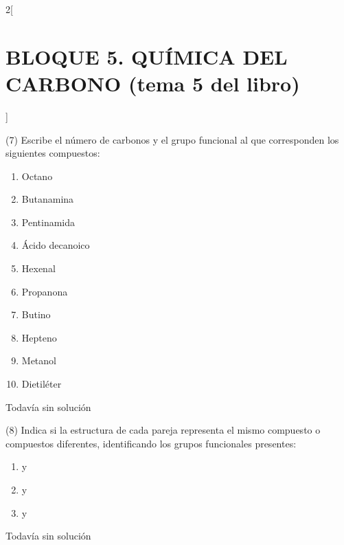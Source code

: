 \documentclass[10pt]{article}
\begin{document}
\begin{multicols}{2}[
  \section{BLOQUE 5. QUÍMICA DEL CARBONO (tema 5 del libro)}
  ]
\begin{exercise}[
    tags    = {},
    topics  = {química,química básica},
    source  = {FQ 1B MGH 2016, p85, e26},
  ]

  (7) Escribe el número de carbonos y el grupo funcional al que
  corresponden los siguientes compuestos:
  \begin{enumerate}
    \item Octano
    \item Butanamina
    \item Pentinamida
    \item Ácido decanoico
    \item Hexenal
    \item Propanona
    \item Butino
    \item Hepteno
    \item Metanol
    \item Dietiléter
  \end{enumerate}
\end{exercise}

\begin{solution}[print=false]
  Todavía sin solución
\end{solution}




\begin{exercise}[
    tags    = {},
    topics  = {química,química básica},
    source  = {FQ 1B MGH 2016, p85, e26},
  ]

  (8) Indica si la estructura de cada pareja representa el mismo
  compuesto o compuestos diferentes, identificando los grupos
  funcionales presentes:
  \begin{enumerate}
    \item {} y 
    \item {} y 
    \item {} y 
  \end{enumerate}
\end{exercise}

\begin{solution}[print=false]
  Todavía sin solución
\end{solution}




\begin{exercise}[
    tags    = {},
    topics  = {química,química básica},
    source  = {FQ 1B MGH 2016, p85, e26},
  ]


\end{exercise}
\end{multicols}
\end{document}
